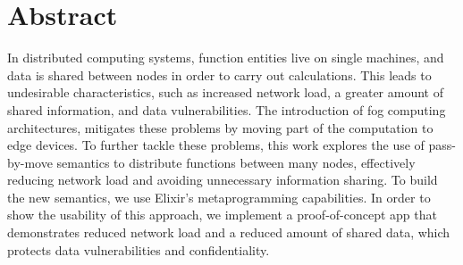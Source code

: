 
\chapter{Abstract}

In distributed computing systems, function entities live on single machines, and data is shared between nodes in order to 
carry out calculations. This leads to undesirable characteristics,
such as increased network load, a greater amount of shared information, and data vulnerabilities. The introduction of fog computing architectures, mitigates these problems by moving part of the computation to edge devices. To further tackle these problems, this work explores the use of pass-by-move semantics to distribute functions between many nodes, effectively reducing network load and avoiding unnecessary information sharing. To build the new semantics, we use  Elixir's metaprogramming capabilities. In order to show the usability of this approach, we implement a proof-of-concept app that demonstrates reduced network load and a reduced amount of shared data, which protects data vulnerabilities and confidentiality.


\endinput

